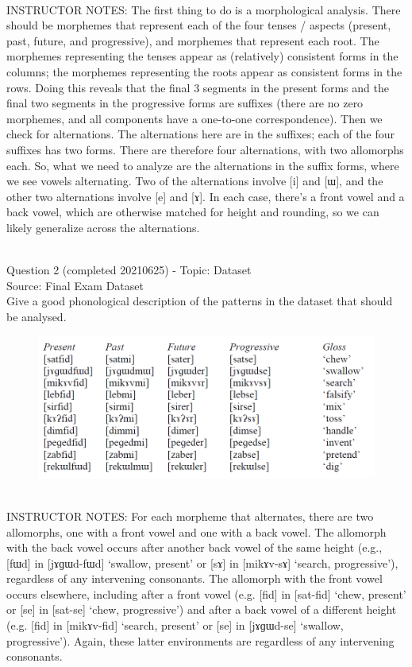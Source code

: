 \documentclass[12pt]{article}
\begin{document}
~\\
INSTRUCTOR NOTES: The first thing to do is a morphological analysis. There should be morphemes that represent each of the four tenses / aspects (present, past, future, and progressive), and morphemes that represent each root. The morphemes representing the tenses appear as (relatively) consistent forms in the columns; the morphemes representing the roots appear as consistent forms in the rows. Doing this reveals that the final 3 segments in the present forms and the final two segments in the progressive forms are suffixes (there are no zero morphemes, and all components have a one-to-one correspondence). Then we check for alternations. The alternations here are in the suffixes; each of the four suffixes has two forms. There are therefore four alternations, with two allomorphs each. So, what we need to analyze are the alternations in the suffix forms, where we see vowels alternating. Two of the alternations involve [i] and [ɯ], and the other two alternations involve [e] and [ɤ]. In each case, there’s a front vowel and a back vowel, which are otherwise matched for height and rounding, so we can likely generalize across the alternations.


~\\

{\large Question 2} (completed 20210625) - Topic: Dataset\\
Source: Final Exam Dataset\\

Give a good phonological description of the patterns in the dataset that should be analysed.\\

\begin{figure}[H]
\includegraphics{../images/final_dataset.png}
\end{figure}

~\\
INSTRUCTOR NOTES: For each morpheme that alternates, there are two allomorphs, one with a front vowel and one with a back vowel. The allomorph with the back vowel occurs after another back vowel of the same height (e.g., [fɯd] in [jɤɡɯd-fɯd] ‘swallow, present’ or [sɤ] in [mikɤv-sɤ] ‘search, progressive’), regardless of any intervening consonants. The allomorph with the front vowel occurs elsewhere, including after a front vowel (e.g. [fid] in [sat-fid] ‘chew, present’ or [se] in [sat-se] ‘chew, progressive’) and after a back vowel of a different height (e.g. [fid] in [mikɤv-fid] ‘search, present’ or [se] in [jɤɡɯd-se] ‘swallow, progressive’). Again, these latter environments are regardless of any intervening consonants.
\end{document}
